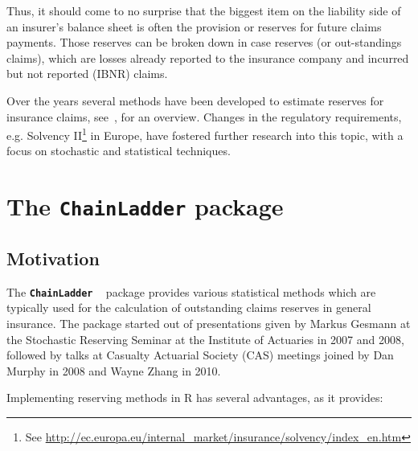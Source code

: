 \documentclass{article}
\newcommand{\chainladder}{\textbf{\texttt{ChainLadder}} }
\begin{document}
Thus, it should come to no surprise that the biggest item on the
liability side of an insurer's balance sheet is often the provision or
reserves for future claims payments. Those reserves can be broken
down in case reserves (or out-standings claims), which are losses
already reported to the insurance company and incurred but not
reported (IBNR) claims.

Over the years several methods have been developed to estimate
reserves for insurance claims, see~\cite{Schmidt2011},
\cite{EnglandVerrall2002} for an overview. Changes in the regulatory
requirements, e.g. Solvency II\footnote{See
  \url{http://ec.europa.eu/internal_market/insurance/solvency/index_en.htm}}
in Europe, have fostered further research into this topic, with a
focus on stochastic and statistical techniques.   

\section{The \chainladder package}

\subsection{Motivation}
The \chainladder~\cite{chainladder} package provides various
statistical methods which are typically used for the calculation of
outstanding claims reserves in general insurance.  The package started
out of presentations given by Markus Gesmann at the Stochastic
Reserving Seminar at the Institute of Actuaries in 2007 and 2008,
followed by talks at Casualty Actuarial Society (CAS)  meetings joined
by Dan Murphy in 2008 and Wayne Zhang in 2010.  

Implementing reserving methods in R has several advantages, as it provides:
\end{document}

